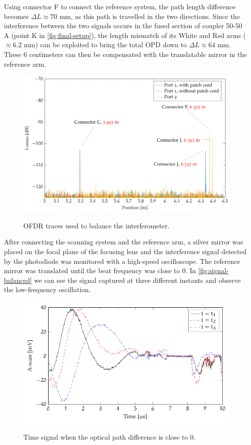 Using connector F to connect the reference system, the path length difference becomes $\Delta L \approx 70$ mm, as this path is travelled in the two directions. Since the interference between the two signals occurs in the fused section of coupler 50-50 A (point K in \autoref{fig:final-setup}), the length mismatch of its White and Red arms ($\approx 6.2$ mm) can be exploited to bring the total \ac{OPD} down to $\Delta L \approx 64$ mm. These 6 centimeters can then be compensated with the translatable mirror in the reference arm. 


\begin{figure}[hbt]
	\myfloatalign
	{	\includegraphics[width=\linewidth]{gfx/ch3/obr-balancing}}
	\caption{OFDR traces used to balance the interferometer.}\label{fig:obr-balancing}
\end{figure}

After connecting the scanning system and the reference arm, a silver mirror was placed on the focal plane of the focusing lens and the interference signal detected by the photodiode was monitored with a high-speed oscilloscope. The reference mirror was translated until the beat frequency was close to 0. In \autoref{fig:signal-balanced} we can see the signal captured at three different instants and observe the low-frequency oscillation. 


\begin{figure}[hbt]
	\myfloatalign
	{	\includegraphics[width=0.9\linewidth]{gfx/tikz/balancing/balanced}}
	\caption{Time signal when the optical path difference is close to 0.}\label{fig:signal-balanced}
\end{figure}

